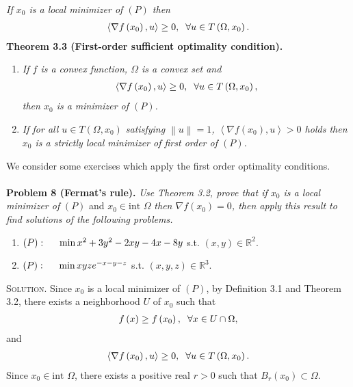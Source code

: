 \documentclass[a4paper]{article}
\numberwithin{equation}{section}
\begin{document}
\textit{If $x_0$ is a local minimizer of $\left(P\right)$ then}
\begin{align}
\left\langle {\nabla f\left( {{x_0}} \right),u} \right\rangle  \ge 0,\hspace{0.2cm}\forall u \in T\left( {\Omega ,{x_0}} \right).
\end{align}
\textbf{Theorem 3.3 (First-order sufficient optimality condition).} 
\begin{enumerate}
\item \textit{If $f$ is a convex function, $\Omega$ is a convex set and}
\begin{align}
\left\langle {\nabla f\left( {{x_0}} \right),u} \right\rangle  \ge 0,\hspace{0.2cm}\forall u \in T\left( {\Omega ,{x_0}} \right),
\end{align}
\textit{then $x_0$ is a minimizer of $\left(P\right)$.}
\item \textit{If for all $u\in T\left(\Omega,x_0\right)$ satisfying $\left\| u \right\| = 1$, $\left\langle {\nabla f\left( {{x_0}} \right),u} \right\rangle  > 0$ holds then $x_0$ is a strictly local minimizer of first order of $\left(P\right)$.}
\end{enumerate}
We consider some exercises which apply the first order optimality conditions.\\
\\
\textbf{Problem 8 (Fermat's rule).} \textit{Use Theorem 3.2, prove that if $x_0$ is a local minimizer of} $\left(P\right)$ and $x_0\in \mbox{int } \Omega$ \textit{then ${\nabla f\left( {{x_0}} \right)}=0$, then apply this result to find solutions of the following problems.}
\begin{enumerate}
\item $\left( P \right):\hspace{0.5cm}\min {x^2} + 3{y^2} - 2xy - 4x - 8y$ s.t. $\left(x,y\right) \in \mathbb{R}^2$.
\item $\left( P \right):\hspace{0.5cm}\min xyz{e^{ - x - y - z}}$ s.t. $\left(x,y,z\right)\in \mathbb{R}^3$.
\end{enumerate}
\textsc{Solution.} Since $x_0$ is a local minimizer of $\left(P\right)$, by Definition 3.1 and Theorem 3.2, there exists a neighborhood $U$ of $x_0$ such that
\begin{align}
\label{3.6}
f\left( x \right) \ge f\left( {{x_0}} \right),\hspace{0.2cm}\forall x \in U \cap \Omega ,
\end{align}
and
\begin{align}
\label{3.7}
\left\langle {\nabla f\left( {{x_0}} \right),u} \right\rangle  \ge 0,\hspace{0.2cm}\forall u \in T\left( {\Omega ,{x_0}} \right).
\end{align}
Since $x_0 \in \mbox{int }\Omega$, there exists a positive real $r>0$ such that $B_r\left(x_0\right) \subset \Omega$. 
\end{document}

